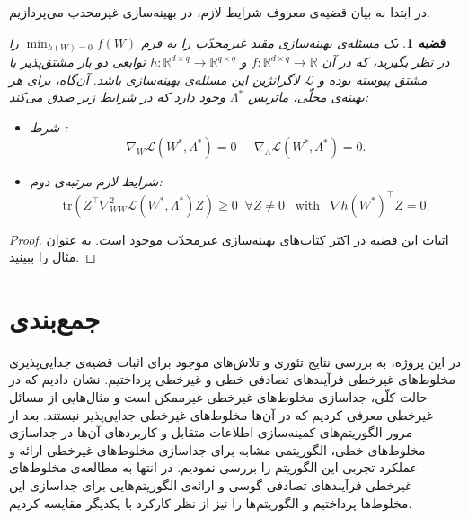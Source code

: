\documentclass[BScThesis, onesided]{thesis}
\newtheorem{theorem}{قضیه}[chapter]
\newcommand{\R}{\mathbb{R}}
\newcommand{\tr}{\mathrm{tr}}
\newcommand{\LL}{\mathcal{L}}
\begin{document}
در ابتدا به بیان قضیه‌ی معروف شرایط لازم، در بهینه‌سازی غیرمحدب می‌پردازیم. 
\begin{theorem}
یک مسئله‌ی بهینه‌سازی مقید غیرمحدّب را به فرم
$\min_{h(W) = 0} f(W)$
را در نظر بگیرید، که در آن
$f: \R^{d\times q} \to \R$
و
$h: \R^{d\times q} \to \R^{q\times q}$
توابعی دو بار مشتق‌پذیر با مشتق پیوسته بوده و 
$\LL$
لاگرانژین این مسئله‌ی بهینه‌سازی باشد. آن‌گاه، برای هر بهینه‌ی محلّی،  ماتریس
$\Lambda^*$
وجود دارد که  در شرایط زیر صدق می‌کند:
\begin{itemize}
\item
شرط
:
\begin{equation}
\nabla_W \LL(W^*, \Lambda^*) =0 \;\;\;\;\;
\nabla_\Lambda \LL(W^*, \Lambda^*) =0.
\end{equation}

\item
شرایط لازم مرتبه‌ی دوم:
\begin{equation}
\tr (Z^\top \nabla^2_{WW} \LL (W^*, \Lambda^*)Z) \geq 0 \;\; \forall Z\neq 0 \;\;\;  \mathrm{with} \;\;\; \nabla h(W^*)^\top Z = 0.
\end{equation}
\end{itemize}
\end{theorem}
\begin{proof}
	اثبات این قضیه در اکثر کتاب‌های بهینه‌سازی غیرمحدّب موجود است. به عنوان مثال 
	\cite{nocedal2006numerical}
	را ببینید.
\end{proof}


\chapter{جمع‌بندی}

در این پروژه، به بررسی نتایج تئوری و تلاش‌های موجود برای اثبات قضیه‌ی جدایی‌پذیری مخلوط‌های غیرخطی فرآیند‌های تصادفی خطی و غیرخطی پرداختیم. نشان دادیم که در حالت کلّی، جداسازی مخلوط‌های غیرخطی غیرممکن است و مثال‌هایی از مسائل غیرخطی معرفی کردیم که در آن‌ها مخلوط‌های غیرخطی جدایی‌پذیر نیستند. بعد از مرور الگوریتم‌های کمینه‌سازی اطلاعات متقابل و کاربرد‌های آن‌ها در جداسازی مخلوط‌های خطی، الگوریتمی مشابه برای جداسازی مخلوط‌های غیرخطی ارائه و عملکرد تجربی این الگوریتم را بررسی نمودیم. در انتها به مطالعه‌ی مخلوط‌های غیرخطی فرآیند‌های تصادفی گوسی و ارائه‌ی الگوریتم‌هایی برای جداسازی این مخلوط‌ها پرداختیم و الگوریتم‌ها را نیز از نظر کارکرد با یکدیگر مقایسه کردیم.




\end{document}
